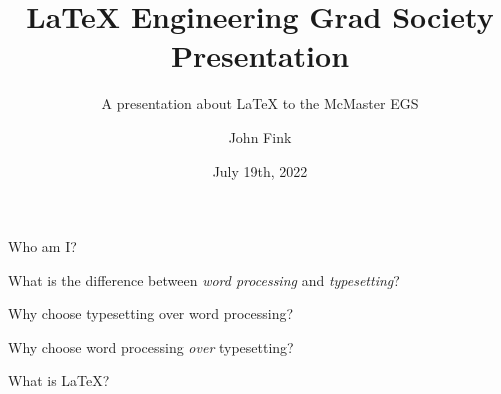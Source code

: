 \documentclass{beamer}
\title{\LaTeX{} Engineering Grad Society Presentation}
\subtitle{A presentation about \LaTeX{} to the McMaster EGS}
\author{John Fink}
\institute{McMaster University}
\date{July 19th, 2022}
\begin{document}
	\begin{frame}
		\titlepage
	\end{frame}

	\begin{frame}
		Who am I?
	\end{frame}

\begin{frame}
	What is the difference between \textit{word processing} and \textit{typesetting}?
\end{frame}

\begin{frame}
	Why choose typesetting over word processing?
\end{frame}

\begin{frame}
\end{frame}

\begin{frame}
	Why choose word processing \textit{over} typesetting?
\end{frame}

\begin{frame}
	What is \LaTeX{}?
\end{frame}

\begin{frame}
	
\end{frame}
	
\end{document}
